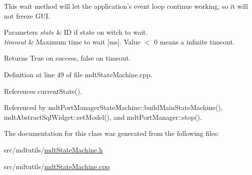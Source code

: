 This wait method will let the application's event loop continue working, so it will not freeze G\-U\-I.


\begin{DoxyParams}{Parameters}
{\em state} & I\-D if state on witch to wait. \\
\hline
{\em timeout} & Maximum time to wait \mbox{[}ms\mbox{]}. Value $<$ 0 means a infinite timeout. \\
\hline
\end{DoxyParams}
\begin{DoxyReturn}{Returns}
True on success, false on timeout. 
\end{DoxyReturn}


Definition at line 49 of file mdt\-State\-Machine.\-cpp.



References current\-State().



Referenced by mdt\-Port\-Manager\-State\-Machine\-::build\-Main\-State\-Machine(), mdt\-Abstract\-Sql\-Widget\-::set\-Model(), and mdt\-Port\-Manager\-::stop().



The documentation for this class was generated from the following files\-:\begin{DoxyCompactItemize}
\item 
src/mdtutils/\hyperlink{mdt_state_machine_8h}{mdt\-State\-Machine.\-h}\item 
src/mdtutils/\hyperlink{mdt_state_machine_8cpp}{mdt\-State\-Machine.\-cpp}\end{DoxyCompactItemize}
